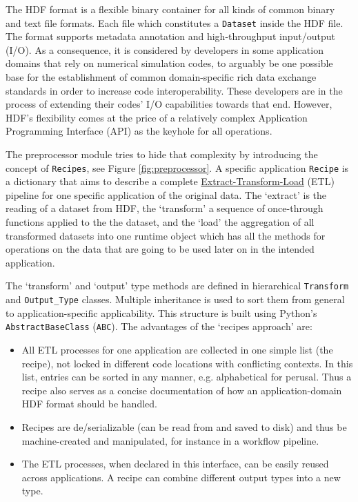 The HDF format is a flexible binary container for all kinds of common binary and
text file formats. Each file which constitutes a \texttt{Dataset} inside the HDF
file. The format supports metadata annotation and high-throughput input/output
(I/O). As a consequence, it is considered by developers in some application
domains that rely on numerical simulation codes, to arguably be one possible
base for the establishment of common domain-specific rich data exchange
standards in order to increase code interoperability. These developers are in
the process of extending their codes' I/O capabilities towards that end.
However, HDF's flexibility comes at the price of a relatively complex
Application Programming Interface (API) as the keyhole for all operations.

The preprocessor module tries to hide that complexity by introducing the concept
of \texttt{Recipes}, see Figure \ref{fig:preprocessor}. A specific application
\texttt{Recipe} is a dictionary that aims to describe a complete
\href{https://en.wikipedia.org/wiki/Extract,_transform,_load}{Extract-Transform-Load}
(ETL) pipeline for one specific application of the original data. The `extract'
is the reading of a dataset from HDF, the `transform' a sequence of once-through
functions applied to the the dataset, and the `load' the aggregation of all
transformed datasets into one runtime object which has all the methods for
operations on the data that are going to be used later on in the intended
application.

The `transform' and `output' type methods are defined in hierarchical
\texttt{Transform} and \texttt{Output\_Type} classes. Multiple inheritance is
used to sort them from general to application-specific applicability. This
structure is built using Python's \texttt{AbstractBaseClass} (\texttt{ABC}). The
advantages of the `recipes approach' are:
\begin{itemize}
\item All ETL processes for one application are collected in one simple list
    (the recipe), not locked in different code locations with conflicting
    contexts. In this list, entries can be sorted in any manner, e.g.
    alphabetical for perusal. Thus a recipe also serves as a concise
    documentation of how an application-domain HDF format should be handled.
\item Recipes are de/serializable (can be read from and saved to disk) and thus be
    machine-created and manipulated, for instance in a workflow pipeline.
\item The ETL processes, when declared in this interface, can be easily reused
    across applications. A recipe can combine different output types into a new
    type.
\end{itemize}

